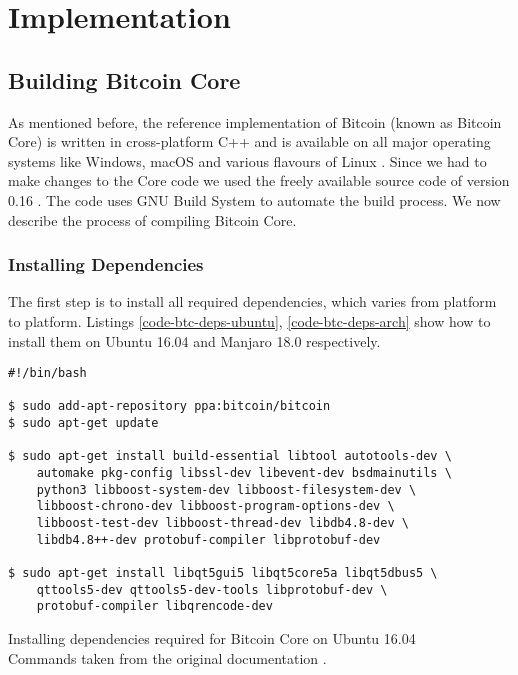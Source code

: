 
\chapter{Implementation} \label{ch-impl}

\section{Building Bitcoin Core} \label{impl-btc-compile}

As mentioned before, the reference implementation of Bitcoin (known as Bitcoin Core) is written in cross-platform C++ and is available on all major operating systems like Windows, macOS and various flavours of Linux \cite{bitcoinDownload}. Since we had to make changes to the Core code we used the freely available source code of version 0.16 \cite{bitcoinSource}. The code uses GNU Build System \cite{gnuBuild} to automate the build process. We now describe the process of compiling Bitcoin Core. 

\subsection*{Installing Dependencies}

The first step is to install all required dependencies, which varies from platform to platform. Listings \ref{code-btc-deps-ubuntu}, \ref{code-btc-deps-arch} show how to install them on Ubuntu 16.04 and Manjaro 18.0 respectively.

\begin{listing}[!htb]
    \begin{verbatim}
#!/bin/bash

$ sudo add-apt-repository ppa:bitcoin/bitcoin
$ sudo apt-get update

$ sudo apt-get install build-essential libtool autotools-dev \
    automake pkg-config libssl-dev libevent-dev bsdmainutils \
    python3 libboost-system-dev libboost-filesystem-dev \
    libboost-chrono-dev libboost-program-options-dev \
    libboost-test-dev libboost-thread-dev libdb4.8-dev \
    libdb4.8++-dev protobuf-compiler libprotobuf-dev

$ sudo apt-get install libqt5gui5 libqt5core5a libqt5dbus5 \
    qttools5-dev qttools5-dev-tools libprotobuf-dev \
    protobuf-compiler libqrencode-dev

    \end{verbatim}

    \caption[Installing dependencies required for Bitcoin Core on Ubuntu 16.04]
    {
    Installing dependencies required for Bitcoin Core on Ubuntu 16.04 \\
    \footnotesize
    Commands taken from the original documentation \cite{bitcoinBuildUnix}.
    }
    \label{code-btc-deps-ubuntu}
\end{listing}


